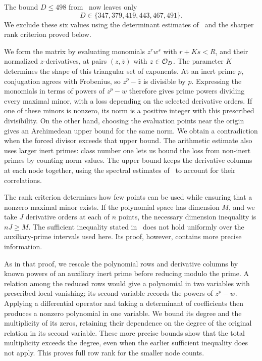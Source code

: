 The bound $D\leq498$ from~\cite{chung498} now leaves only
\[
  D\in\{347,379,419,443,467,491\}.
\]
We exclude these six values using the determinant estimates
of~\cite{chung498} and the sharper rank criterion proved below.

We form the matrix by evaluating monomials $z^rw^s$ with $r+Ks<R$,
and their normalized $z$-derivatives, at pairs $(z,\bar z)$ with
$z\in\mathcal O_D$.  The parameter $K$ determines the shape of this triangular
set of exponents.  At an inert prime $p$, conjugation agrees with
Frobenius, so $z^p-\bar z$ is divisible by $p$.  Expressing the monomials
in terms of powers of $z^p-w$ therefore gives prime powers dividing every
maximal minor, with a loss depending on the selected derivative orders.
If one of these minors is nonzero, its norm is a positive
integer with this prescribed divisibility.  On the other hand, choosing
the evaluation points near the origin gives an Archimedean upper bound
for the same norm.  We obtain a contradiction when the forced divisor
exceeds that upper bound.  The arithmetic estimate also uses larger inert primes: class number one
lets us bound the loss from non-inert primes by counting norm values.
The upper bound keeps the derivative columns at each node together,
using the spectral estimates of~\cite{chung498} to account for their
correlations.

The rank criterion determines how few points can be used while ensuring
that a nonzero maximal minor exists.  If the polynomial space has dimension
$M$, and we take $J$ derivative orders at each of $n$ points, the necessary
dimension inequality is $nJ\geq M$.  The sufficient inequality stated
in~\cite{chung498} does not hold uniformly over the auxiliary-prime
intervals used here. Its proof, however, contains more precise information.

As in that proof, we rescale the polynomial rows and derivative columns
by known powers of an auxiliary
inert prime before reducing modulo the prime.  A relation among the reduced
rows would give a polynomial in two variables with prescribed local
vanishing; its second variable records the powers of $z^p-w$.  Applying a differential operator and taking a determinant of
coefficients then produces a nonzero polynomial in one variable.  We bound
its degree and the multiplicity of its zeros, retaining their dependence
on the degree of the original relation in its second variable.  These
more precise bounds show that the total multiplicity exceeds the degree,
even when the earlier sufficient inequality does not apply.  This proves
full row rank for the smaller node counts.

